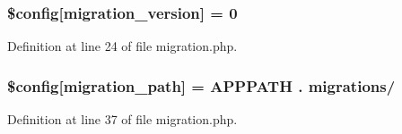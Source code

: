 \subsubsection[{\texorpdfstring{\$config}{$config}}]{\setlength{\rightskip}{0pt plus 5cm}\$config\mbox{[}\textquotesingle{}migration\+\_\+version\textquotesingle{}\mbox{]} = 0}\hypertarget{migration_8php_a53ca48939aaf8c92f0c0d239a294fff2}{}\label{migration_8php_a53ca48939aaf8c92f0c0d239a294fff2}


Definition at line 24 of file migration.\+php.

\subsubsection[{\texorpdfstring{\$config}{$config}}]{\setlength{\rightskip}{0pt plus 5cm}\$config\mbox{[}\textquotesingle{}migration\+\_\+path\textquotesingle{}\mbox{]} = A\+P\+P\+P\+A\+TH . \textquotesingle{}migrations/\textquotesingle{}}\hypertarget{migration_8php_abc04383313304e348060a7ee39f5a8ee}{}\label{migration_8php_abc04383313304e348060a7ee39f5a8ee}


Definition at line 37 of file migration.\+php.

